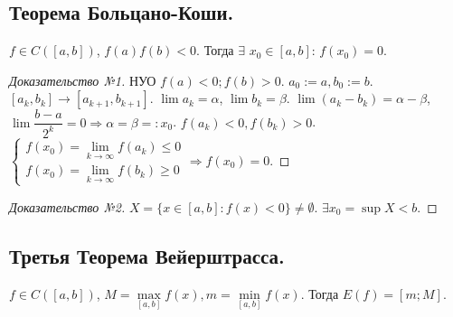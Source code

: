 \documentclass[12pt]{article}
\begin{document}
	\subsection{Теорема Больцано-Коши.}
	\begin{theorem}
		$f \in C([a, b])$, $f(a)f(b) < 0$. Тогда $\exists$ $x_0 \in [a, b]$: $f(x_0) = 0$.
	\end{theorem}
	\begin{proof}[Доказательство №1]
		НУО $f(a) < 0; f(b) > 0$. $a_0 := a, b_0 := b$. $[a_k, b_k] \rightarrow [a_{k + 1}, b_{k + 1}]$. $\lim a_k = \alpha$, $\lim b_k = \beta$. $\lim (a_k - b_k) = \alpha - \beta$, $\lim \dfrac{b - a}{2^k} = 0 \Rightarrow \alpha = \beta =: x_0$. $f(a_k) < 0, f(b_k) > 0$. $ \begin{cases}
			f(x_0) = \lim\limits_{k \rightarrow \infty} f(a_k) \leqslant 0 \\
			f(x_0) = \lim\limits_{k \rightarrow \infty} f(b_k) \geqslant 0
		\end{cases} \Rightarrow f(x_0) = 0$.
	\end{proof}
	\begin{proof}[Доказательство №2]
		$X = \{ x \in [a, b]: f(x) < 0 \} \not= \emptyset$. $\exists x_0 = \sup X < b$.
	\end{proof}
	\subsection{Третья Теорема Вейерштрасса.}
	\begin{theorem}
		$f \in C([a, b])$, $M = \max\limits_{[a, b]} f(x), m = \min\limits_{[a, b]} f(x)$. Тогда $E(f) = [m; M]$.
	\end{theorem}
\end{document}
